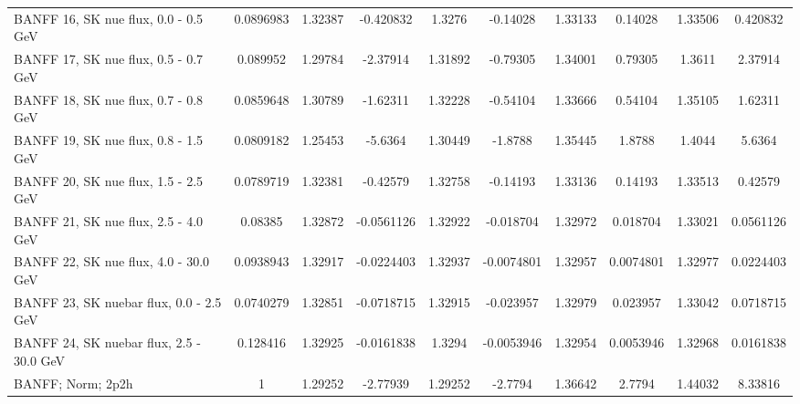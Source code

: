 \documentclass{standalone}
\begin{document}
\begin{tabular}{| l | S | S  S | S  S | S  S | S  S | }
                                            BANFF 16, SK nue flux, 0.0 - 0.5 GeV &       0.0896983 &         1.32387 &       -0.420832 &          1.3276 &        -0.14028 &         1.33133 &         0.14028 &         1.33506 &        0.420832 \\ 
                                            BANFF 17, SK nue flux, 0.5 - 0.7 GeV &        0.089952 &         1.29784 &        -2.37914 &         1.31892 &        -0.79305 &         1.34001 &         0.79305 &          1.3611 &         2.37914 \\ 
                                            BANFF 18, SK nue flux, 0.7 - 0.8 GeV &       0.0859648 &         1.30789 &        -1.62311 &         1.32228 &        -0.54104 &         1.33666 &         0.54104 &         1.35105 &         1.62311 \\ 
                                            BANFF 19, SK nue flux, 0.8 - 1.5 GeV &       0.0809182 &         1.25453 &         -5.6364 &         1.30449 &         -1.8788 &         1.35445 &          1.8788 &          1.4044 &          5.6364 \\ 
                                            BANFF 20, SK nue flux, 1.5 - 2.5 GeV &       0.0789719 &         1.32381 &        -0.42579 &         1.32758 &        -0.14193 &         1.33136 &         0.14193 &         1.33513 &         0.42579 \\ 
                                            BANFF 21, SK nue flux, 2.5 - 4.0 GeV &         0.08385 &         1.32872 &      -0.0561126 &         1.32922 &       -0.018704 &         1.32972 &        0.018704 &         1.33021 &       0.0561126 \\ 
                                           BANFF 22, SK nue flux, 4.0 - 30.0 GeV &       0.0938943 &         1.32917 &      -0.0224403 &         1.32937 &      -0.0074801 &         1.32957 &       0.0074801 &         1.32977 &       0.0224403 \\ 
                                         BANFF 23, SK nuebar flux, 0.0 - 2.5 GeV &       0.0740279 &         1.32851 &      -0.0718715 &         1.32915 &       -0.023957 &         1.32979 &        0.023957 &         1.33042 &       0.0718715 \\ 
                                        BANFF 24, SK nuebar flux, 2.5 - 30.0 GeV &        0.128416 &         1.32925 &      -0.0161838 &          1.3294 &      -0.0053946 &         1.32954 &       0.0053946 &         1.32968 &       0.0161838 \\ 
                                                               BANFF; Norm; 2p2h &               1 &         1.29252 &        -2.77939 &         1.29252 &         -2.7794 &         1.36642 &          2.7794 &         1.44032 &         8.33816 \\ 

\end{tabular}
\end{document}
